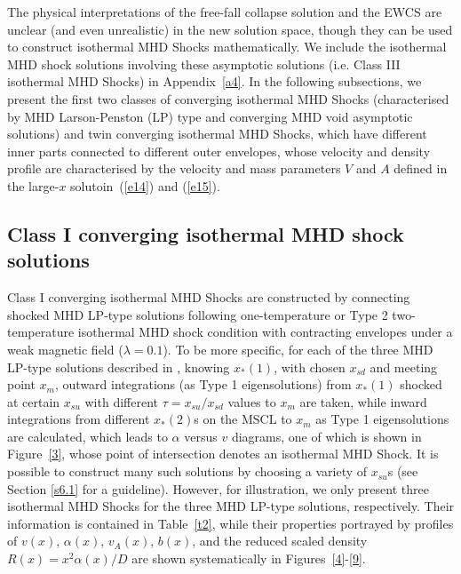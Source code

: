 \documentclass[fleqn,usenatbib]{mnras}
\begin{document}
The physical interpretations of the free-fall collapse solution and the EWCS are unclear (and even unrealistic) in the new solution space, though they can be used to construct isothermal MHD Shocks mathematically. We include the isothermal MHD shock solutions involving these asymptotic solutions (i.e. Class III isothermal MHD Shocks) in Appendix~\ref{a4}. In the following subsections, we present the first two classes of converging isothermal MHD Shocks (characterised by MHD Larson-Penston (LP) type and converging MHD void asymptotic solutions) and twin converging isothermal MHD Shocks, which have different inner parts connected to different outer envelopes, whose velocity and density profile are characterised by the velocity and mass parameters $V$ and $A$ defined in the large-$x$ solutoin~(\ref{e14}) and (\ref{e15}).

\subsection{Class I converging isothermal MHD shock solutions}
\label{s5.1}

Class I converging isothermal MHD Shocks are constructed by connecting shocked MHD LP-type solutions following one-temperature or Type 2 two-temperature isothermal MHD shock condition with contracting envelopes under a weak magnetic field ($\lambda=0.1$). To be more specific, for each of the three MHD LP-type solutions described in \citet{yuLou2005}, knowing $x_{*}(1)$, with chosen $x_{sd}$ and meeting point $x_{m}$, outward integrations (as Type 1 eigensolutions) from $x_{*}(1)$ shocked at certain $x_{su}$ with different $\tau=x_{su}/x_{sd}$ values to $x_{m}$ are taken, while inward integrations from different $x_{*}(2)$s on the MSCL to $x_{m}$ as Type 1 eigensolutions are calculated, which leads to $\alpha$ versus $v$ diagrams, one of which is shown in Figure~\ref{3}, whose point of intersection denotes an isothermal MHD Shock. It is possible to construct many such solutions by choosing a variety of $x_{su}$s (see Section \ref{s6.1} for a guideline). However, for illustration, we only present three isothermal MHD Shocks for the three MHD LP-type solutions, respectively. Their information is contained in Table~\ref{t2}, while their properties portrayed by profiles of $v(x)$, $\alpha(x)$, $v_{A}(x)$, $b(x)$, and the reduced scaled density $R(x)=x^{2}\alpha(x)/D$ are shown systematically in Figures~\ref{4}-\ref{9}. 
\end{document}
